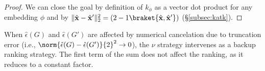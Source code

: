 \begin{proof} We can close the goal by definition of $k_{\phi}$ as a vector dot product for any embedding $\phi$ and by  $\|\hat{\mathbf{x}}-\hat{\mathbf{x}}'\|_2^2=(2-1\braket{\hat{\mathbf{x}},\hat{\mathbf{x}}'})$ (\S\ref{subsec:katk}).
%	
\end{proof}



%
When $\hat{\epsilon}(G)$ and $\hat{\epsilon}(G')$ are affected by numerical cancelation due to truncation error (i.e., $\norm{\hat{\epsilon}(G)-\hat{\epsilon}(G')}{2}^2\to 0$), the $\nu$ strategy intervenes as a backup ranking strategy. The first term of the sum does not affect the ranking, as it reduces to a constant factor.

%






